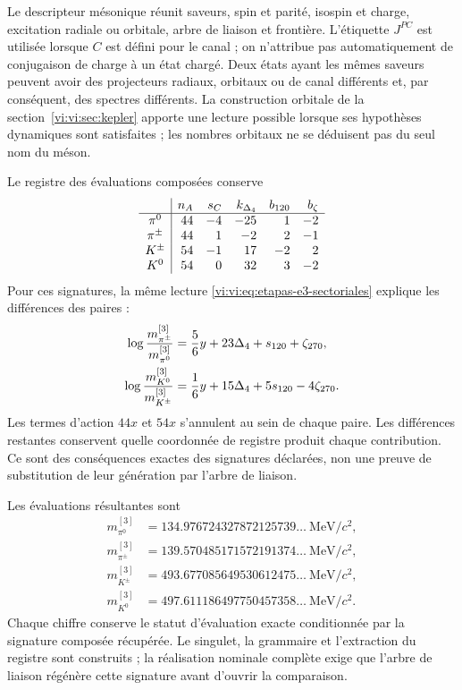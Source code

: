 Le descripteur mésonique réunit saveurs, spin et parité, isospin et charge,
excitation radiale ou orbitale, arbre de liaison et frontière. L’étiquette
\(J^{PC}\) est utilisée lorsque \(C\) est défini pour le canal ; on
n’attribue pas automatiquement de conjugaison de charge à un état chargé. Deux
états ayant les mêmes saveurs peuvent avoir des projecteurs
radiaux, orbitaux ou de canal différents et, par conséquent, des spectres différents. La
construction orbitale de la section~\ref{vi:vi:sec:kepler} apporte une
lecture possible lorsque ses hypothèses dynamiques sont satisfaites ; les nombres
orbitaux ne se déduisent pas du seul nom du méson.

Le registre des évaluations composées conserve
\[
\begin{array}{c|r r r r r}
 &n_A&s_C&k_{\Delta_4}&b_{120}&b_\zeta\\\hline
 \pi^0&44&-4&-25&1&-2\\
 \pi^\pm&44&1&-2&2&-1\\
 K^\pm&54&-1&17&-2&2\\
 K^0&54&0&32&3&-2
\end{array}
\]
Pour ces signatures, la même lecture \eqref{vi:vi:eq:etapas-e3-sectoriales}
explique les différences des paires :
\begin{align}
 \log\frac{m_{\pi^\pm}^{[3]}}{m_{\pi^0}^{[3]}}
 &=\frac56y+23\Delta_4+s_{120}+\zeta_{270},\notag\\
 \log\frac{m_{K^0}^{[3]}}{m_{K^\pm}^{[3]}}
 &=\frac16y+15\Delta_4+5s_{120}-4\zeta_{270}.
 \label{vi:vi:eq:desdoblamientos-mesonicos}
\end{align}
Les termes d’action \(44x\) et \(54x\) s’annulent au sein de
chaque paire. Les différences restantes conservent quelle coordonnée de
registre produit chaque contribution. Ce sont des conséquences exactes des
signatures déclarées, non une preuve de substitution de leur génération par l’arbre
de liaison.

Les évaluations résultantes sont
\begin{align*}
 m_{\pi^0}^{[3]}&=134.976724327872125739\ldots\ \mathrm{MeV}/c^2,\\
 m_{\pi^\pm}^{[3]}&=139.570485171572191374\ldots\ \mathrm{MeV}/c^2,\\
 m_{K^\pm}^{[3]}&=493.677085649530612475\ldots\ \mathrm{MeV}/c^2,\\
 m_{K^0}^{[3]}&=497.611186497750457358\ldots\ \mathrm{MeV}/c^2.
\end{align*}
Chaque chiffre conserve le
statut d’évaluation exacte conditionnée par la signature composée
récupérée. Le singulet, la grammaire et l’extraction du registre sont
construits ; la réalisation nominale complète exige que l’arbre de
liaison régénère cette signature avant d’ouvrir la comparaison.

